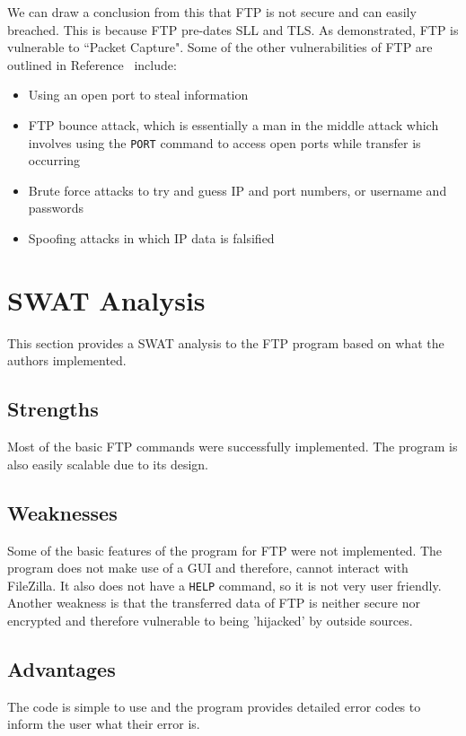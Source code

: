 \documentclass[journal, a4paper]{IEEEtran}
\begin{document}
We can draw a conclusion from this that FTP is not secure and can easily breached. This is because FTP pre-dates SLL and TLS. As demonstrated, FTP is vulnerable to ``Packet Capture". Some of the other vulnerabilities of FTP are outlined in Reference~\cite{rfc2557} include:
\begin{itemize}
	\item Using an open port to steal information
	\item FTP bounce attack, which is essentially a man in the middle attack which involves using the \texttt{PORT} command to access open ports while transfer is occurring
	\item Brute force attacks to try and guess IP and port numbers, or username and passwords
	\item Spoofing attacks in which IP data is falsified
\end{itemize}


\section{SWAT Analysis}

This section provides a SWAT analysis to the FTP program based on what the authors implemented. 

\subsection{Strengths}
Most of the basic FTP commands were successfully implemented. The program is also easily scalable due to its design.

\subsection{Weaknesses}
Some of the basic features of the program for FTP were not implemented. The program does not make use of a GUI and therefore, cannot interact with FileZilla. It also does not have a \texttt{HELP} command, so it is not very user friendly. Another weakness is that the transferred data of FTP is neither secure nor encrypted and therefore vulnerable to being 'hijacked' by outside sources.

\subsection{Advantages}
The code is simple to use and the program provides detailed error codes to inform the user what their error is.
\end{document}
